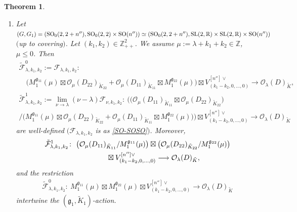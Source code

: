 \documentclass[pdftex]{sigma}
\numberwithin{equation}{section}
\newtheorem{Theorem}{Theorem}[section]
\newcommand{\BZ}{\mathbb{Z}}
\newcommand{\BR}{\mathbb{R}}
\newcommand{\fg}{\mathfrak{g}}
\newcommand{\cF}{\mathcal{F}}
\newcommand{\cO}{\mathcal{O}}
\begin{document}
\begin{Theorem}
\begin{enumerate}
\begin{gather*}
\end{gather*}
is well-defined $(\cF_{\lambda,k}$ is as \eqref{SO*-SO*SO*}$)$, and its restriction
\begin{gather*} \tilde{\cF}_{\lambda,k}^i\colon \ \big(M_{i+1}^{\fg_{11}}(\mu)/M_i^{\fg_{11}}(\mu)\big)\boxtimes \big(M_{i+1}^{\fg_{22}}(\mu)/M_i^{\fg_{22}}(\mu)\big)
\longrightarrow \cO_\lambda(D)_{\tilde{K}} \end{gather*}
intertwines the $(\fg_1,\tilde{K}_1)$-action.
\item[$(4)$] Let $(G,G_1)=(\operatorname{SO}_0(2,2+n''),\operatorname{SO}_0(2,2)\times \operatorname{SO}(n''))\simeq (\operatorname{SO}_0(2,2+n''),{\rm SL}(2,\BR)\times {\rm SL}(2,\BR)\times \operatorname{SO}(n''))$ $($up to covering$)$. Let $(k_1,k_2)\in\BZ_{++}^2$. We assume $\mu:=\lambda+k_1+k_2\in\BZ$, $\mu\le 0$. Then
\begin{gather*}
\tilde{\cF}_{\lambda,k_1,k_2}^0:=\cF_{\lambda,k_1,k_2}\colon \\
\quad \big(M_1^{\fg_{11}}(\mu)\boxtimes \cO_\mu(D_{22})_{\tilde{K}_{22}}+\cO_\mu(D_{11})_{\tilde{K}_{11}}\boxtimes M_1^{\fg_{22}}(\mu)\big)
\boxtimes V_{(k_1-k_2,0,\ldots,0)}^{[n'']\vee} \longrightarrow \cO_\lambda(D)_{\tilde{K}},
\\
\tilde{\cF}_{\lambda,k_1,k_2}^1:=\lim_{\nu\to\lambda} (\nu-\lambda)\cF_{\nu,k_1,k_2} \colon \ \bigl(\big(\cO_\mu(D_{11})_{\tilde{K}_{11}}\boxtimes \cO_\mu(D_{22})_{\tilde{K}_{22}}\big) \\
/\big(M_1^{\fg_{11}}(\mu)\boxtimes \cO_\mu(D_{22})_{\tilde{K}_{22}}+\cO_\mu(D_{11})_{\tilde{K}_{11}}\boxtimes M_1^{\fg_{22}}(\mu)\big)\bigr)
\boxtimes V_{(k_1-k_2,0,\ldots,0)}^{[n'']\vee} \longrightarrow \cO_\lambda(D)_{\tilde{K}}
\end{gather*}
are well-defined $(\cF_{\lambda,k_1,k_2}$ is as \eqref{SO-SOSO}$)$. Moreover,
\begin{gather*}
 \tilde{\cF}_{\lambda,k_1,k_2}^1\colon \ \big(\cO_\mu(D_{11})_{\tilde{K}_{11}}/M_1^{\fg_{11}}(\mu)\big)
\boxtimes \big(\cO_\mu(D_{22})_{\tilde{K}_{22}}/M_1^{\fg_{22}}(\mu)\big)\\
\hphantom{\tilde{\cF}_{\lambda,k_1,k_2}^1\colon}{} \ \boxtimes V_{(k_1-k_2,0,\ldots,0)}^{[n'']\vee} \longrightarrow \cO_\lambda(D)_{\tilde{K}},
\end{gather*}
and the restriction
\begin{gather*} \tilde{\cF}_{\lambda,k_1,k_2}^0\colon \ M_1^{\fg_{11}}(\mu)\boxtimes M_1^{\fg_{22}}(\mu)\boxtimes V_{(k_1-k_2,0,\ldots,0)}^{[n'']\vee}
\longrightarrow \cO_\lambda(D)_{\tilde{K}} \end{gather*}
intertwine the $(\fg_1,\tilde{K}_1)$-action.
\end{enumerate}
\end{Theorem}
\end{document}
